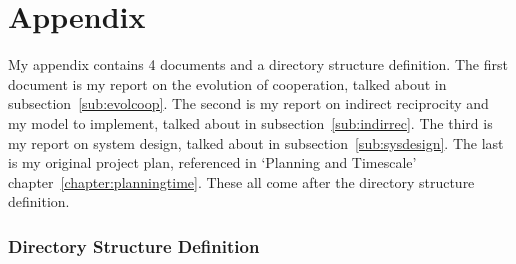 \documentclass[]{final_report}
\begin{document}
\chapter{Appendix}
\label{appendix}
My appendix contains 4 documents and a directory structure definition. The first document is my report on the evolution of cooperation, talked about in subsection~\ref{sub:evolcoop}. The second is my report on indirect reciprocity and my model to implement, talked about in subsection~\ref{sub:indirrec}. The third is my report on system design, talked about in subsection~\ref{sub:sysdesign}. The last is my original project plan, referenced in `Planning and Timescale' chapter~\ref{chapter:planningtime}. These all come after the directory structure definition.\\

\subsection{Directory Structure Definition}
\end{document}

